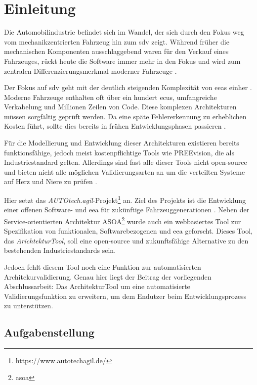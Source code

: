 
\chapter{Einleitung}
\label{ch:introduction}
Die Automobilindustrie befindet sich im Wandel, der sich durch den Fokus weg vom mechanikzentrierten Fahrzeug hin zum \gls{sdv} zeigt. Während früher die mechanischen Komponenten ausschlaggebend waren für den Verkauf eines Fahrzeuges, rückt heute die Software immer mehr in den Fokus und wird zum zentralen Differenzierungsmerkmal moderner Fahrzeuge \cite{Cha21}\cite{zhao2022}.

Der Fokus auf \gls{sdv} geht mit der deutlich steigenden Komplexität von \glspl{eea} einher \cite{Cha21}\cite{Pancik2018}. Moderne Fahrzeuge enthalten oft über ein hundert \glspl{ecu}, umfangreiche Verkabelung und Millionen Zeilen von Code. Diese komplexen Architekturen müssen sorgfältig geprüft werden. Da eine späte Fehlererkennung zu erheblichen Kosten führt, sollte dies bereits in frühen Entwicklungsphasen passieren \cite{Cha21}.

Für die Modellierung und Entwicklung dieser Architekturen existieren bereits funktionsfähige, jedoch meist kostenpflichtige Tools wie PREEvision, die als Industriestandard gelten. Allerdings sind fast alle dieser Tools nicht open-source und bieten nicht alle möglichen Validierungsarten an um die verteilten Systeme auf Herz und Niere zu prüfen \cite{askaripoor2022architecture}\cite{schauffele2016architectural}.

Hier setzt das \textit{AUTOtech.agil}-Projekt\footnote{https://www.autotechagil.de/} an. Ziel des Projekts ist die Entwicklung einer offenen Software- und \gls{eea} für zukünftige Fahrzeuggenerationen \cite{autotechagil2024}\cite{vanKempen2023}. Neben der Service-orientierten Architektur ASOA\footnote{\gls{asoa}} wurde auch ein webbasiertes Tool zur Spezifikation von funktionalen, Softwarebezogenen und \gls{eea} geforscht. Dieses Tool, das \textit{ArichtekturTool},  soll eine open-source und zukunftsfähige Alternative zu den bestehenden Industriestandards sein.

Jedoch fehlt diesem Tool noch eine Funktion zur automatisierten Architekurvalidierung. Genau hier liegt der Beitrag der vorliegenden Abschlussarbeit: Das ArchitekturTool um eine automatisierte Validierungsfunktion zu erweitern, um dem Endutzer beim Entwicklungsprozess zu unterstützen.
\section{Aufgabenstellung}
\label{sect:aufgabenstellung}

